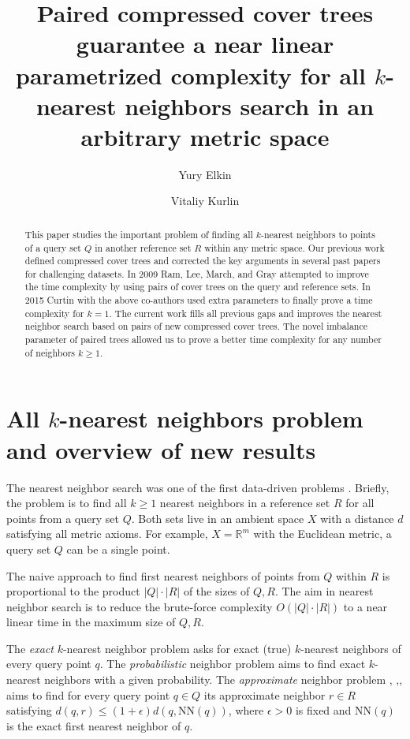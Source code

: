 \documentclass[a4paper,UKenglish,cleveref, autoref]{lipics-v2019}
\title{ Paired compressed cover trees guarantee a near linear parametrized complexity for all $k$-nearest neighbors search in an arbitrary metric space }
\author{Yury Elkin}{Materials Innovation Factory and Computer Science department, University of Liverpool, UK}{yura.elkin@gmail.com}{}{}%
\author{Vitaliy Kurlin}{Materials Innovation Factory and Computer Science department, University of Liverpool, UK}{vitaliy.kurlin@gmail.com}{}{}
\numberwithin{algocf}{section}
\theoremstyle{definition}
\theoremstyle{definition}
\theoremstyle{definition}
\theoremstyle{plain}
\newcommand{\R}{\mathbb{R}}
\newcommand{\ep}{\epsilon}
\newcommand{\NN}{\mathrm{NN}}
\begin{document}
\maketitle

\begin{abstract}
This paper studies the important problem of finding all $k$-nearest neighbors to points of a query set $Q$ in another reference set $R$ within any metric space. 
Our previous work defined compressed cover trees and corrected the key arguments in several past papers for challenging datasets. 
In 2009 Ram, Lee, March, and Gray attempted to improve the time complexity by using pairs of cover trees on the query and reference sets.  
In 2015 Curtin with the above co-authors used extra parameters to finally prove a time complexity for $k=1$.
The current work fills all previous gaps and improves the nearest neighbor search based on pairs of new compressed cover trees. 
The novel imbalance parameter of paired trees allowed us to prove a better time complexity for any number of neighbors $k\geq 1$. 
\end{abstract}

\section{All $k$-nearest neighbors problem and overview of new results}
\label{sec:intro}

The nearest neighbor search was one of the first data-driven problems \cite{cover1967nearest}.
Briefly, the problem is to find all $k\geq 1$ nearest neighbors in a reference set $R$ for all points from a query set $Q$.
Both sets live in an ambient space $X$ with a distance $d$ satisfying all metric axioms.
For example, $X=\R^m$ with the Euclidean metric, a query set $Q$ can be a single point.
\medskip

The naive approach to find first nearest neighbors of points from $Q$ within $R$ is proportional to the product $|Q|\cdot|R|$ of the sizes of $Q, R$.
The aim in nearest neighbor search is to reduce the brute-force complexity $O(|Q|\cdot|R|)$ to a near linear time in the maximum size of $Q,R$.
\medskip
 
The \emph{exact} $k$-nearest neighbor problem asks for exact (true) $k$-nearest neighbors of every query point $q$. 
The \emph{probabilistic} neighbor problem \cite{manocha2007empirical} aims to find exact $k$-nearest neighbors with a given probability. 
The \emph{approximate} neighbor problem \cite{arya1993approximate}, \cite{krauthgamer2004navigating},\cite{andoni2018approximate},\cite{wang2021comprehensive} aims to find for every query point $q \in Q$ its approximate neighbor $r\in R$ satisfying $d(q,r) \leq (1+\epsilon)d(q,\NN(q))$, where $\ep>0$ is fixed and $\NN(q)$ is the exact first nearest neighbor of $q$.
\medskip
\end{document}
